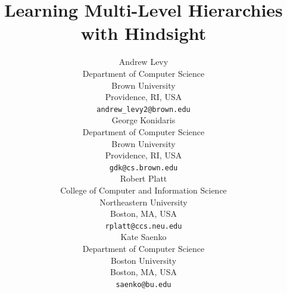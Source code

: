 \documentclass{article} %
\title{Learning Multi-Level Hierarchies with \enspace Hindsight}
\author{Andrew Levy\\
Department of Computer Science\\
Brown University\\
Providence, RI, USA \\
\texttt{andrew\_levy2@brown.edu} \\
\And
George Konidaris \\
Department of Computer Science\\
Brown University\\
Providence, RI, USA \\
\texttt{gdk@cs.brown.edu} \\
\And
Robert Platt \\
College of Computer and Information Science \\
Northeastern University \\
Boston, MA, USA \\
\texttt{rplatt@ccs.neu.edu} \\
\And
\enspace \enspace \enspace \enspace \enspace \enspace \enspace \enspace \enspace \enspace \enspace Kate Saenko \\
\enspace \enspace \enspace \enspace \enspace \enspace \enspace \enspace \enspace \enspace \enspace Department of Computer Science \\
\enspace \enspace \enspace \enspace \enspace \enspace \enspace \enspace \enspace \enspace \enspace Boston University \\
\enspace \enspace \enspace \enspace \enspace \enspace \enspace \enspace \enspace \enspace \enspace Boston, MA, USA \\
\enspace \enspace \enspace \enspace \enspace \texttt \enspace \enspace \enspace \enspace \enspace \enspace \texttt{saenko@bu.edu} \\
}
\begin{document}
\maketitle

\end{document}
